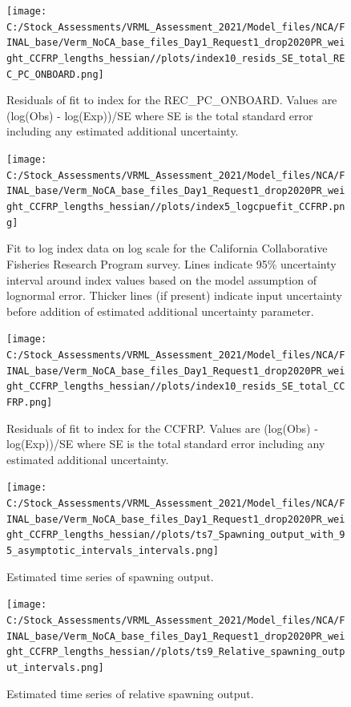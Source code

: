 \documentclass[11pt,
  english,
]{article}
\begin{document}
\begin{figure}
\centering
\texttt{[image: C:/Stock\_Assessments/VRML\_Assessment\_2021/Model\_files/NCA/FINAL\_base/Verm\_NoCA\_base\_files\_Day1\_Request1\_drop2020PR\_weight\_CCFRP\_lengths\_hessian//plots/index10\_resids\_SE\_total\_REC\_PC\_ONBOARD.png]}
\caption{Residuals of fit to index for the REC\_PC\_ONBOARD. Values are (log(Obs) - log(Exp))/SE where SE is the total standard error including any estimated additional uncertainty.\label{fig:cpue-resid-REC-PC-ONBOARD}}
\end{figure}

\begin{figure}
\centering
\texttt{[image: C:/Stock\_Assessments/VRML\_Assessment\_2021/Model\_files/NCA/FINAL\_base/Verm\_NoCA\_base\_files\_Day1\_Request1\_drop2020PR\_weight\_CCFRP\_lengths\_hessian//plots/index5\_logcpuefit\_CCFRP.png]}
\caption{Fit to log index data on log scale for the California Collaborative Fisheries Research Program survey. Lines indicate 95\% uncertainty interval around index values based on the model assumption of lognormal error. Thicker lines (if present) indicate input uncertainty before addition of estimated additional uncertainty parameter.\label{fig:log-cpue-CCFRP}}
\end{figure}

\begin{figure}
\centering
\texttt{[image: C:/Stock\_Assessments/VRML\_Assessment\_2021/Model\_files/NCA/FINAL\_base/Verm\_NoCA\_base\_files\_Day1\_Request1\_drop2020PR\_weight\_CCFRP\_lengths\_hessian//plots/index10\_resids\_SE\_total\_CCFRP.png]}
\caption{Residuals of fit to index for the CCFRP. Values are (log(Obs) - log(Exp))/SE where SE is the total standard error including any estimated additional uncertainty.\label{fig:cpue-resid-CCFRP}}
\end{figure}

\FloatBarrier

\begin{figure}
\centering
\texttt{[image: C:/Stock\_Assessments/VRML\_Assessment\_2021/Model\_files/NCA/FINAL\_base/Verm\_NoCA\_base\_files\_Day1\_Request1\_drop2020PR\_weight\_CCFRP\_lengths\_hessian//plots/ts7\_Spawning\_output\_with\_95\_asymptotic\_intervals\_intervals.png]}
\caption{Estimated time series of spawning output.\label{fig:spawnout}}
\end{figure}

\FloatBarrier

\begin{figure}
\centering
\texttt{[image: C:/Stock\_Assessments/VRML\_Assessment\_2021/Model\_files/NCA/FINAL\_base/Verm\_NoCA\_base\_files\_Day1\_Request1\_drop2020PR\_weight\_CCFRP\_lengths\_hessian//plots/ts9\_Relative\_spawning\_output\_intervals.png]}
\caption{Estimated time series of relative spawning output.\label{fig:depl}}
\end{figure}
\end{document}
